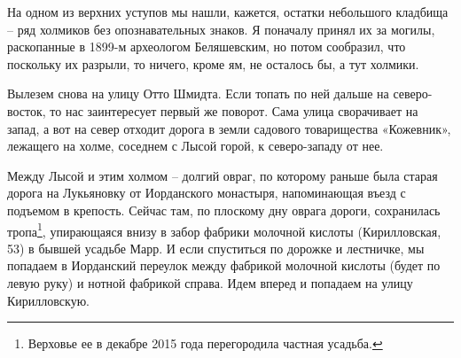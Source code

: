 На одном из верхних уступов мы нашли, кажется, остатки небольшого кладбища – ряд холмиков без опознавательных знаков. Я поначалу принял их за могилы, раскопанные в 1899-м археологом Беляшевским, но потом сообразил, что поскольку их разрыли, то ничего, кроме ям, не осталось бы, а тут холмики.

Вылезем снова на улицу Отто Шмидта. Если топать по ней дальше на северо-восток, то нас заинтересует первый же поворот. Сама улица сворачивает на запад, а вот на север отходит дорога в земли садового товарищества «Кожевник», лежащего на холме, соседнем с Лысой горой, к северо-западу от нее. 

Между Лысой и этим холмом – долгий овраг, по которому раньше была старая дорога на Лукьяновку от Иорданского монастыря, напоминающая въезд с подъемом в крепость. Сейчас там, по плоскому дну оврага дороги, сохранилась тропа\footnote{Верховье ее в декабре 2015 года перегородила частная усадьба.}, упирающаяся внизу в забор фабрики молочной кислоты (Кирилловская, 53) в бывшей усадьбе Марр. И если спуститься по дорожке и лестничке, мы попадаем в Иорданский переулок между фабрикой молочной кислоты (будет по левую руку) и нотной фабрикой справа. Идем вперед и попадаем на улицу Кирилловскую.
